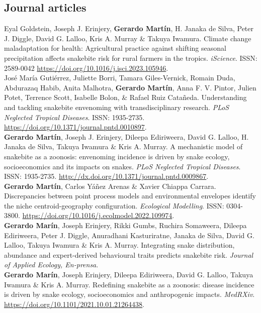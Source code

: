 \documentclass[12pt, a4paper]{article}
\newcommand{\years}[1]{\marginnote{\scriptsize #1}}
\begin{document}
\subsection*{Journal articles}
\noindent 

\years{2023} Eyal Goldstein, Joseph J. Erinjery, \textbf{Gerardo Mart\'in}, H. Janaka de Silva, Peter J. Diggle, David G. Lalloo, Kris A. Murray \& Takuya Iwamura. Climate change maladaptation for health: Agricultural practice against shifting seasonal precipitation affects snakebite risk for rural farmers in the tropics. \emph{iScience}. ISSN: 2589-0042 \url{https://doi.org/10.1016/j.isci.2023.105946}.\\

\years{2022} Jos\'e Mar\'ia Guti\'errez, Juliette Borri, Tamara Giles-Vernick, Romain Duda, Abdurazaq Habib, Anita Malhotra, \textbf{Gerardo Mart\'in}, Anna F. V. Pintor, Julien Potet, Terrence Scott, Isabelle Bolon, \& Rafael Ruiz Cata\~neda. Understanding and tackling snakebite envenoming with transdisciplinary research. \emph{PLoS Neglected Tropical Diseases}. ISSN: 1935-2735. \url{https://doi.org/10.1371/journal.pntd.0010897}. \\

\years{2022} \textbf{Gerardo Mart\'in}, Joseph J. Erinjery, Dileepa Ediriweera, David G. Lalloo, H. Janaka de Silva, Takuya Iwamura \& Kris A. Murray. A mechanistic model of snakebite as a zoonosis: envenoming incidence is driven by snake ecology, socioeconomics and its impacts on snakes. \emph{PLoS Neglected Tropical Diseases}. ISSN: 1935-2735. \url{http://dx.doi.org/10.1371/journal.pntd.0009867}.\\

\years{2022} \textbf{Gerardo Mart\'in}, Carlos Y\'a\~nez Arenas \& Xavier Chiappa Carrara. Discrepancies between point process models and environmental envelopes identify the niche centroid-geography configuration. \emph{Ecological Modelling}. ISSN: 0304-3800. \url{https://doi.org/10.1016/j.ecolmodel.2022.109974}.\\


\years{2021} \textbf{Gerardo Mar\'in}, Joseph Erinjery, Rikki Gumbs, Ruchira Somaweera, Dileepa Ediriweera, Peter J. Diggle, Anuradhani Kasturiratne, Janaka de Silva, David G. Lalloo, Takuya Iwamura \& Kris A. Murray. Integrating snake distribution, abundance and expert-derived behavioural traits predicts snakebite risk. \emph{Journal of Applied Ecology, En-prensa}.\\

\years{2021} \textbf{Gerardo Mar\'in}, Joseph Erinjery, Dileepa Ediriweera, David G. Lalloo, Takuya Iwamura \& Kris A. Murray. Redefining snakebite as a zoonosis: disease incidence is driven by snake ecology, socioeconomics and anthropogenic impacts. \emph{MedRXiv}. \url{https://doi.org/10.1101/2021.10.01.21264438}.\\
\end{document}
